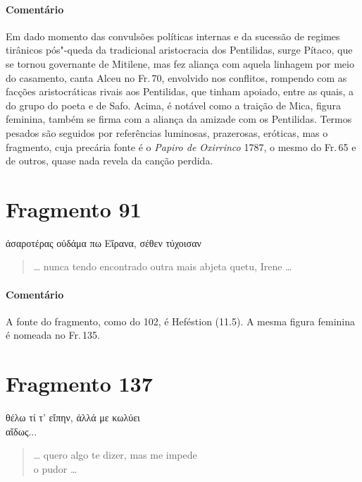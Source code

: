 \medskip

\paragraph{Comentário} {Em dado momento das convulsões políticas internas e da sucessão de regimes
tirânicos pós"-queda da tradicional aristocracia dos Pentilidas, surge Pítaco, que se tornou governante de
Mitilene, mas fez aliança com aquela linhagem por meio do casamento,
canta Alceu no Fr.\,70, envolvido nos conflitos,
rompendo com as facções aristocráticas rivais aos Pentilidas, que tinham apoiado, entre as quais, a
do grupo do poeta e de Safo. Acima, é notável como a traição de 
Mica, figura feminina, também se firma com a aliança da amizade com os Pentilidas. Termos
pesados são seguidos por referências luminosas, prazerosas, eróticas, mas o
fragmento, cuja precária fonte é o \emph{Papiro de Oxirrinco} 1787, o mesmo do Fr.\,65 e de outros, quase nada revela da canção perdida.}



\section{Fragmento 91}

\begin{gkverse}
ἀσαροτέρας οὐδάμα πω Εἴρανα, σέθεν τύχοισαν
\end{gkverse}

\begin{verse}
\ldots{} nunca tendo encontrado outra mais abjeta que\qb{}tu, Irene \ldots{}
\end{verse}

\medskip

{\paragraph{Comentário} A fonte do fragmento, como do 102, é Heféstion (11.5).
A mesma figura feminina é nomeada no Fr.\,135.}


\section{Fragmento 137}

\begin{gkverse}
θέλω τί τ’ εἴπην, ἀλλά με κωλύει\\
αἴδως...
\end{gkverse}

\begin{verse}
\ldots{} quero algo te dizer, mas me impede\\
o pudor \ldots{}
\end{verse}

